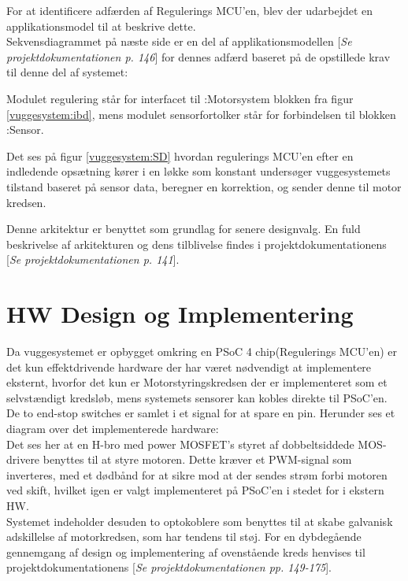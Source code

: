 For at identificere adfærden af Regulerings MCU'en, blev der udarbejdet en applikationsmodel til at beskrive dette.\\Sekvensdiagrammet på næste side er en del af applikationsmodellen [\textit{Se projektdokumentationen p. 146}] for dennes adfærd baseret på de opstillede krav til denne del af systemet:


Modulet regulering står for interfacet til :Motorsystem blokken fra figur \ref{vuggesystem:ibd}, mens modulet sensorfortolker står for forbindelsen til blokken :Sensor.

Det ses på figur \ref{vuggesystem:SD} hvordan regulerings MCU'en efter en indledende opsætning kører i en løkke som konstant undersøger vuggesystemets tilstand baseret på sensor data, beregner en korrektion, og sender denne til motor kredsen.

Denne arkitektur er benyttet som grundlag for senere designvalg. En fuld beskrivelse af arkitekturen og dens tilblivelse findes i projektdokumentationens [\textit{Se projektdokumentationen p. 141}].

\newpage
\section{HW Design og Implementering}
\label{vs_HW}
Da vuggesystemet er opbygget omkring en PSoC 4 chip(Regulerings MCU'en) er det kun effektdrivende hardware der har været nødvendigt at implementere eksternt, hvorfor det kun er Motorstyringskredsen der er implementeret som et selvstændigt kredsløb, mens systemets sensorer kan kobles direkte til PSoC'en. De to end-stop switches er samlet i et signal for at spare en pin. Herunder ses et diagram over det implementerede hardware:\\
Det ses her at en H-bro med power MOSFET's styret af dobbeltsiddede MOS-drivere benyttes til at styre motoren. Dette kræver et PWM-signal som inverteres, med et dødbånd for at sikre mod at der sendes strøm forbi motoren ved skift, hvilket igen er valgt implementeret på PSoC'en i stedet for i ekstern HW. \\ Systemet indeholder desuden to optokoblere som benyttes til at skabe galvanisk adskillelse af motorkredsen, som har tendens til støj.
For en dybdegående gennemgang af design og implementering af ovenstående kreds henvises til projektdokumentationens [\textit{Se projektdokumentationen pp. 149-175}].\\



